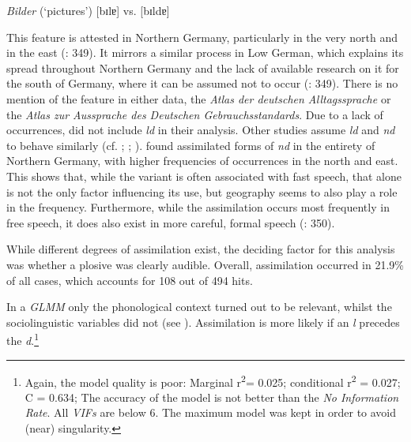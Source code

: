 \documentclass[output=paper]{langsci/langscibook}
\begin{document}
\ea
\label{ex:stuhl:14}  
\textit{Bilder} (‘pictures’) {[bɪlɐ]} vs. {[bɪldɐ]}
\z
 
 

This feature is attested in Northern Germany, particularly in the very north and in the east (\citealt{elmentaler_norddeutscher_2015}: 349). It mirrors a similar process in Low German, which explains its spread throughout Northern Germany and the lack of available research on it for the south of Germany, where it can be assumed not to occur (\citealt{elmentaler_norddeutscher_2015}: 349). There is no mention of the feature in either  data, the \textit{Atlas der deutschen Alltagssprache} or the \textit{Atlas zur Aussprache des Deutschen Gebrauchsstandards}. Due to a lack of occurrences,  \citet[349]{elmentaler_norddeutscher_2015} did not include \textit{ld} in their analysis. Other studies assume \textit{ld} and \textit{nd} to behave similarly (cf. \citealt{scheel_hamburger_1963}; \citealt{schonfeld_sprache_1989}; \citealt{mihm_sprachgeschichte_2000}).  \citet[349--350]{elmentaler_norddeutscher_2015} found assimilated forms of \textit{nd} in the entirety of Northern Germany, with higher frequencies of occurrences in the north and east. This shows that, while the variant is often associated with fast speech, that alone is not the only factor influencing its use, but geography seems to also play a role in the frequency. Furthermore, while the assimilation occurs most frequently in free speech, it does also exist in more careful, formal speech (\citealt{elmentaler_norddeutscher_2015}: 350).

While different degrees of assimilation exist, the deciding factor for this analysis was whether a plosive was clearly audible. Overall, assimilation occurred in 21.9\% of all cases, which accounts for 108 out of 494 hits.

In a \textit{GLMM} only the phonological context turned out to be relevant, whilst the sociolinguistic variables did not (see ). Assimilation is more likely if an \textit{l} precedes the \textit{d}.\footnote{Again, the model quality is poor: Marginal r\textsuperscript{2}= 0.025; conditional r\textsuperscript{2} = 0.027; C = 0.634; The accuracy of the model is not better than the \textit{No Information Rate}. All \textit{VIFs} are below 6. The maximum model was kept in order to avoid (near) singularity.} 
\end{document}
